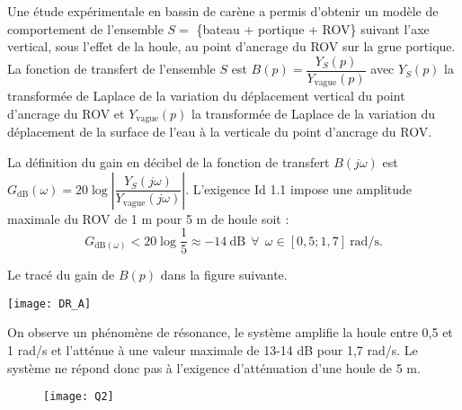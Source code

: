 \normalsize


Une étude expérimentale en bassin de carène a permis d’obtenir un modèle de comportement de l’ensemble
$S =$ \{bateau + portique + ROV\} suivant l’axe vertical, sous l’effet de la houle, au point d’ancrage du ROV sur
la grue portique.\\

La fonction de transfert de l’ensemble $S$ est $B(p) =\dfrac{Y_S(p)}{Y_{\text{vague}}(p)}$ avec $Y_S(p)$ la transformée de Laplace de la variation
du déplacement vertical du point d’ancrage du ROV et $Y_{\text{vague}}(p)$ la transformée de Laplace de la variation du déplacement de la surface de l’eau à la verticale du point d’ancrage du ROV.\\

\fi



\ifprof
\begin{corrige}

La définition du gain en décibel de la fonction de transfert $B(j\omega)$ est $G_{\text{dB}}(\omega)=20\log \left \vert \dfrac{Y_S(j\omega)}{Y_{\text{vague}}(j\omega)}\right \vert$. L'exigence Id 1.1 impose une amplitude maximale du ROV de 1 m pour 5 m de houle soit :
$$\boxed{G_{\text{dB}(\omega)}<20 \log \dfrac{1}{5}\approx - 14 \ \text{dB} \ \ \forall \ \ \omega\in[0,5;1,7]  \ \text{rad/s}.}$$
\end{corrige}
\else
\fi

\ifprof
\else
Le tracé du gain de $B(p)$ dans la figure suivante.



\begin{center}
\texttt{[image: DR\_A]}
\end{center}

\fi


\ifprof
\begin{corrige}
On observe un phénomène de résonance, le système amplifie la houle entre 0,5 et 1 rad/s et l’atténue à une valeur maximale de 13-14 dB pour 1,7 rad/s. Le syst\`eme ne répond donc pas \`a l’exigence d'atténuation d'une houle de 5 m.
\begin{figure}[H]
\centering
\texttt{[image: Q2]}
\end{figure}


\end{corrige}
\else
\fi




